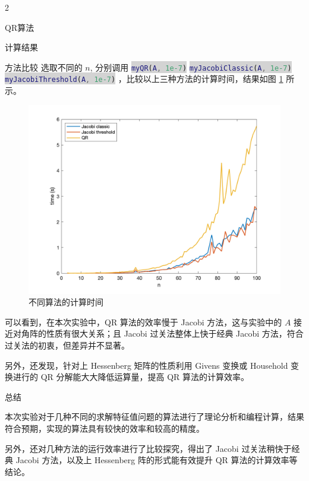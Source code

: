 \documentclass[a4paper]{article}
\newcommand{\inlinecode}[2]{\colorbox{lightgray}{\lstinline[language=#1]$#2$}}
\begin{document}
\begin{multicols}{2}
\begin{section}{QR算法}
\begin{subsection}{计算结果}
	\end{subsection}
	
\end{section}

\begin{section}{方法比较}
	选取不同的 $n$, 分别调用 \inlinecode{Matlab}{myQR(A, 1e-7)} \inlinecode{Matlab}{myJacobiClassic(A, 1e-7)} \inlinecode{Matlab}{myJacobiThreshold(A, 1e-7)} ，比较以上三种方法的计算时间，结果如图 \ref{cp_time} 所示。
	
	\begin{figure}[ht] %
		\centering %
		\includegraphics[width = \textwidth]{img/compare_time.png} 
		\caption{不同算法的计算时间}
		\label{cp_time} 
	\end{figure}	
	
	可以看到，在本次实验中，QR 算法的效率慢于 Jacobi 方法，这与实验中的 $A$ 接近对角阵的性质有很大关系；且 Jacobi 过关法整体上快于经典 Jacobi 方法，符合过关法的初衷，但差异并不显著。
	
	另外，还发现，针对上 Hessenberg 矩阵的性质利用 Givens 变换或 Household 变换进行的 QR 分解能大大降低运算量，提高 QR 算法的计算效率。
	
\end{section}

\begin{section}{总结}
	
	本次实验对于几种不同的求解特征值问题的算法进行了理论分析和编程计算，结果符合预期，实现的算法具有较快的效率和较高的精度。
	
	另外，还对几种方法的运行效率进行了比较探究，得出了 Jacobi 过关法稍快于经典 Jacobi 方法，以及上 Hessenberg 阵的形式能有效提升 QR 算法的计算效率等结论。
	
\end{section}

\end{multicols}



%
%

\end{document}
